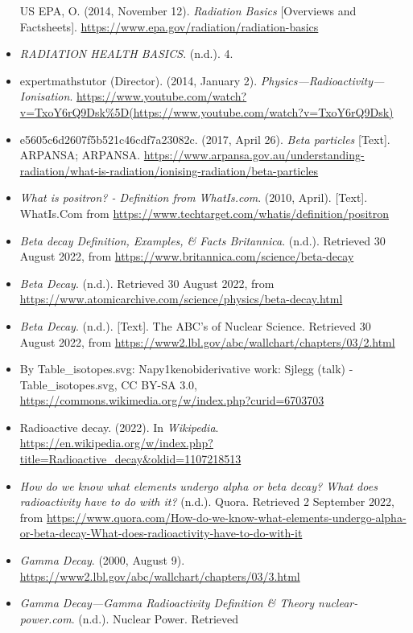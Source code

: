 \documentclass[
]{article}
\begin{document}
\begin{itemize}
  US EPA, O. (2014, November 12). \emph{Radiation Basics} {[}Overviews
  and Factsheets{]}.
  \url{https://www.epa.gov/radiation/radiation-basics}
\item
  \emph{RADIATION HEALTH BASICS}. (n.d.). 4.
\item
  expertmathstutor (Director). (2014, January 2).
  \emph{Physics---Radioactivity---Ionisation}.
  \url{https://www.youtube.com/watch?v=TxoY6rQ9Dsk\%5D(https://www.youtube.com/watch?v=TxoY6rQ9Dsk)}
\item
  e5605c6d2607f5b521c46cdf7a23082c. (2017, April 26). \emph{Beta
  particles} {[}Text{]}. ARPANSA; ARPANSA.
  \url{https://www.arpansa.gov.au/understanding-radiation/what-is-radiation/ionising-radiation/beta-particles}
\item
  \emph{What is positron? - Definition from WhatIs.com}. (2010, April).
  {[}Text{]}. WhatIs.Com from
  \url{https://www.techtarget.com/whatis/definition/positron}
\item
  \emph{Beta decay \textbar{} Definition, Examples, \& Facts \textbar{}
  Britannica}. (n.d.). Retrieved 30 August 2022, from
  \url{https://www.britannica.com/science/beta-decay}
\item
  \emph{Beta Decay}. (n.d.). Retrieved 30 August 2022, from
  \url{https://www.atomicarchive.com/science/physics/beta-decay.html}
\item
  \emph{Beta Decay}. (n.d.). {[}Text{]}. The ABC's of Nuclear Science.
  Retrieved 30 August 2022, from
  \url{https://www2.lbl.gov/abc/wallchart/chapters/03/2.html}
\item
  By Table\_isotopes.svg: Napy1kenobiderivative work: Sjlegg (talk) -
  Table\_isotopes.svg, CC BY-SA 3.0,
  \url{https://commons.wikimedia.org/w/index.php?curid=6703703}
\item
  Radioactive decay. (2022). In \emph{Wikipedia}.
  \url{https://en.wikipedia.org/w/index.php?title=Radioactive_decay\&oldid=1107218513}
\item
  \emph{How do we know what elements undergo alpha or beta decay? What
  does radioactivity have to do with it?} (n.d.). Quora. Retrieved 2
  September 2022, from
  \url{https://www.quora.com/How-do-we-know-what-elements-undergo-alpha-or-beta-decay-What-does-radioactivity-have-to-do-with-it}
\item
  \emph{Gamma Decay}. (2000, August 9).
  \url{https://www2.lbl.gov/abc/wallchart/chapters/03/3.html}
\item
  \emph{Gamma Decay---Gamma Radioactivity \textbar{} Definition \&
  Theory \textbar{} nuclear-power.com}. (n.d.). Nuclear Power. Retrieved

\end{itemize}
\end{document}
